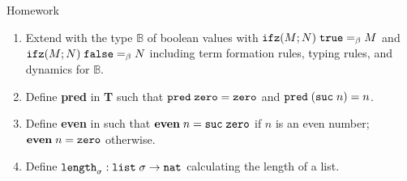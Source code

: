 \begin{frame}{Homework}
  \begin{enumerate}
    \item Extend {\PCF} with the type $\mathbb{B}$ of boolean values with
      $\mathtt{ifz}(M; N)\;\mathtt{true} =_\beta M$ and $\mathtt{ifz}(M; N)\;\mathtt{false}
      =_\beta N$ including term formation rules, typing rules, and dynamics for
      $\mathbb{B}$.

    \item Define \textbf{pred} in {\textbf{T}} such that $\mathtt{pred}\;\mathtt{zero} =\mathtt{zero}$
      and $\mathtt{pred}\;(\mathtt{suc}\;n) = n$.

    \item Define \textbf{even} in {\PCF} such that $\mathbf{even}\;n =
      \mathtt{suc}\;\mathtt{zero}$ if $n$ is an even number; $\mathbf{even}\;n = \mathtt{zero}$
      otherwise. 

    \item Define $\mathtt{length}_\sigma : \mathtt{list}\;\sigma \to \mathtt{nat}$ calculating the length of a list.
    
  \end{enumerate}
  
\end{frame}

%
% 


